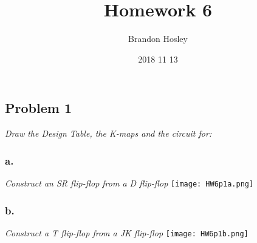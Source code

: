 \documentclass[a4paper,man,natbib]{apa6}
\title{Homework 6}
\author{Brandon Hosley}
\date{2018 11 13}
\affiliation{Mike Davis}
\begin{document}
\maketitle
\raggedbottom
\singlespacing
\subsection{Problem 1}
\emph{Draw the Design Table, the K-maps and the circuit for:}
\subsubsection{a.}
\emph{Construct an SR flip-flop from a D flip-flop}
\texttt{[image: HW6p1a.png]}
\subsubsection{b.}
\emph{Construct a T flip-flop from a JK flip-flop}
\texttt{[image: HW6p1b.png]}
\end{document}
